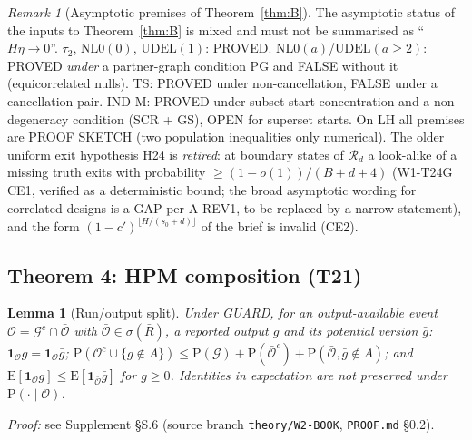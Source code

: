 \documentclass[11pt]{article}
\newtheorem{lemma}{Lemma}
\theoremstyle{definition}
\theoremstyle{remark}
\newtheorem{remark}{Remark}
\renewcommand{\Pr}{\mathrm{P}}
\newcommand{\E}{\mathrm{E}}
\newcommand{\cO}{\mathcal O}
\newcommand{\cG}{\mathcal G}
\newcommand{\cR}{\mathcal R}
\newcommand{\Ind}{\mathbf 1}
\begin{document}
\begin{remark}[Asymptotic premises of Theorem~\ref{thm:B}]\label{rem:Bpremises}
The asymptotic status of the inputs to Theorem~\ref{thm:B} is mixed and must not be summarised as ``$H\eta\to0$''.
$\tau_2$, $\mathrm{NL0}(0)$, $\mathrm{UDEL}(1)$: PROVED. $\mathrm{NL0}(a)$/$\mathrm{UDEL}(a\ge2)$: PROVED \emph{under} a partner-graph condition PG and FALSE
without it (equicorrelated nulls). TS: PROVED under non-cancellation, FALSE under a cancellation pair. IND-M: PROVED under subset-start concentration and a
non-degeneracy condition (SCR + GS), OPEN for superset starts. On LH all premises are PROOF SKETCH (two population inequalities only numerical). The older
uniform exit hypothesis H24 is \emph{retired}: at boundary states of $\cR_d$ a look-alike of a missing truth exits with probability $\ge(1-o(1))/(B+d+4)$ (W1-T24G CE1,
verified as a deterministic bound; the broad asymptotic wording for correlated designs is a GAP per A-REV1, to be replaced by a narrow statement), and the form
$(1-c')^{\lfloor H/(s_0+d)\rfloor}$ of the brief is invalid (CE2).
\end{remark}

\subsection{Theorem 4: HPM composition (T21)}

\begin{lemma}[Run/output split]\label{lem:RO}
Under GUARD, for an output-available event $\cO=\cG^c\cap\bar{\cO}$ with $\bar{\cO}\in\sigma(\bar R)$, a reported output $g$ and its potential version $\bar g$:
$\Ind_{\cO}g=\Ind_{\cO}\bar g$; $\Pr(\cO^c\cup\{g\notin A\})\le\Pr(\cG)+\Pr(\bar{\cO}^c)+\Pr(\bar{\cO},\bar g\notin A)$; and
$\E[\Ind_{\cO}g]\le\E[\Ind_{\bar{\cO}}\bar g]$ for $g\ge0$. Identities in expectation are not preserved under $\Pr(\cdot\mid\cO)$.
\end{lemma}
\noindent\emph{Proof:} see Supplement \S S.6 (source branch \texttt{theory/W2-BOOK}, \texttt{PROOF.md} \S0.2).
\end{document}
